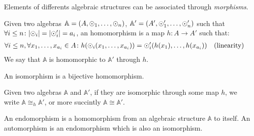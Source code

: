 Elements of differents algebraic structures can be associated through \emph{morphisms}.
\begin{definition}[Homomorphism]
  Given two algebras \(\mathbb{A} = \left(A, \odot_{1}, \dots, \odot_{n}\right)\), 
  \(\mathbb{A}' = \left(A', \odot'_{1}, \dots, \odot'_{n}\right)\) such that 
  \(\forall i \le n\colon \abs{\odot_i} = \abs{\odot'_i} = a_i\), an homomorphism is a map 
  \(h\colon A \to A'\) such that:
  \begin{align*}
    & \forall i \le n, \forall x_1,\dots, x_{a_{i}} \in A\colon 
    h(\odot_{i}(x_{1}, \dots, x_{a_{i}})) = \odot'_{i}(h(x_{1}), \dots, h(x_{a_{i}})) && 
    \textnormal{(linearity)}
  \end{align*}
  We say that \(\mathbb{A}\) is homomorphic to \(\mathbb{A}'\) through \(h\).
\end{definition}

\begin{definition}[Isomorphism]
  An isomorphism is a bijective homomorphism.
\end{definition}

Given two algebras \(\mathbb{A}\) and \(\mathbb{A}'\), if they are isomorphic through some map
\(h\), we write \(\mathbb{A} \cong_h \mathbb{A}'\), or more succintly \(\mathbb{A} \cong \mathbb{A}'\).

\begin{definition}
  An endomorphism is a homomorphism from an algebraic structure \(\mathbb{A}\) to itself.
  An automorphism is an endomorphism which is also an isomorphism.
\end{definition}


